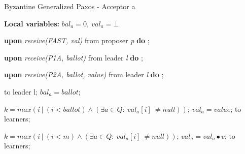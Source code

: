 \begin{algorithm}
\begin{algorithmic}[1]
		\iffalse \State
		\Function{proved\_safe}{Q, m}
		\State $k = max(i\ |\ (i < m) \wedge (\exists a \in Q :\ val_a[i]\ \neq null))$;
		\State $RS = \{R \in k$-$quorum\ |\ \forall a \in R \cap Q : val_a[k] \neq null\}$;
		\State $\gamma(R) = \sqcap \{v_a[k]\ |\ a \in Q \cap R \}$;
		\State $\Gamma = \{\gamma(R)\ |\ R \in RS \}$;
		\State
		\If{$RS = \varnothing$}
		\State \textbf{return} $\{val_a[k]\ |\ (a \in Q) \wedge (val_a[k] \neq null)\}$;
		\Else
		\State \textbf{return} $\sqcup \Gamma$;
		\EndIf
		\EndFunction
		\fi
		
	\end{algorithmic}
\end{algorithm}

\begin{algorithm} 
	\caption{Byzantine Generalized Paxos - Acceptor a}
	\label{BFT-Acc}
	\textbf{Local variables: } $bal_a = 0,\ val_a = \bot$ 
	\begin{algorithmic}[1]
		
		\State \textbf{upon} \textit{receive(FAST, val)} from proposer \textit{p} \textbf{do}
		\State \hspace{\algorithmicindent} ;
		
		\State
		\State \textbf{upon} \textit{receive(P1A, ballot)} from leader \textit{l} \textbf{do}
		\State \hspace{\algorithmicindent} ;
		
		\State
		\State \textbf{upon} \textit{receive(P2A, ballot, value)} from leader \textit{l} \textbf{do}
		\State \hspace{\algorithmicindent} ; 
		
		\State
		\State {} to leader l;
		\State $bal_a = ballot$;
		\EndIf
		\EndFunction
	
		\State
		\State $k = max(i\ |\ (i < ballot) \wedge (\exists a \in Q :\ val_a[i]\ \neq null))$;
		\State $val_a = value$;
		\State {} to learners;
		\EndIf
		\EndFunction
		
		\State
		\State $k = max(i\ |\ (i < m) \wedge (\exists a \in Q :\ val_a[i]\ \neq null))$;
		\State $val_a = val_a \bullet v$;
		\State {} to learners;
		\EndIf
		\EndFunction
	\end{algorithmic}
\end{algorithm}

